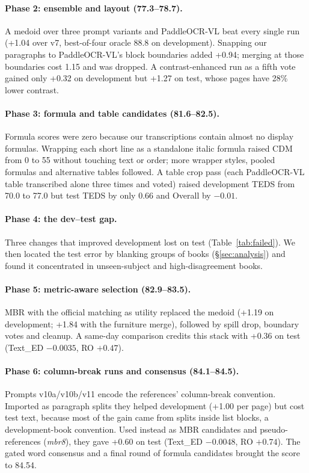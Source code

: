\documentclass[11pt]{article}
\newcommand{\ted}{Text\_ED}
\newcommand{\ro}{RO}
\begin{document}
\paragraph{Phase 2: ensemble and layout (77.3--78.7).} A medoid over three prompt variants and PaddleOCR-VL beat every single run (+1.04 over v7, best-of-four oracle 88.8 on development). Snapping our paragraphs to PaddleOCR-VL's block boundaries added +0.94; merging at those boundaries cost 1.15 and was dropped. A contrast-enhanced run as a fifth vote gained only +0.32 on development but +1.27 on test, whose pages have 28\% lower contrast.

\paragraph{Phase 3: formula and table candidates (81.6--82.5).} Formula scores were zero because our transcriptions contain almost no display formulas. Wrapping each short line as a standalone italic formula raised CDM from 0 to 55 without touching text or order; more wrapper styles, pooled formulas and alternative tables followed. A table crop pass (each PaddleOCR-VL table transcribed alone three times and voted) raised development TEDS from 70.0 to 77.0 but test TEDS by only 0.66 and Overall by $-0.01$.

\paragraph{Phase 4: the dev--test gap.} Three changes that improved development lost on test (Table~\ref{tab:failed}). We then located the test error by blanking groups of books (\S\ref{sec:analysis}) and found it concentrated in unseen-subject and high-disagreement books.

\paragraph{Phase 5: metric-aware selection (82.9--83.5).} MBR with the official matching as utility replaced the medoid (+1.19 on development; +1.84 with the furniture merge), followed by spill drop, boundary votes and cleanup. A same-day comparison credits this stack with +0.36 on test (\ted{} $-0.0035$, \ro{} $+0.47$).

\paragraph{Phase 6: column-break runs and consensus (84.1--84.5).} Prompts v10a/v10b/v11 encode the references' column-break convention. Imported as paragraph splits they helped development (+1.00 per page) but cost test text, because most of the gain came from splits inside list blocks, a development-book convention. Used instead as MBR candidates and pseudo-references (\emph{mbr8}), they gave +0.60 on test (\ted{} $-0.0048$, \ro{} $+0.74$). The gated word consensus and a final round of formula candidates brought the score to 84.54.
\end{document}
